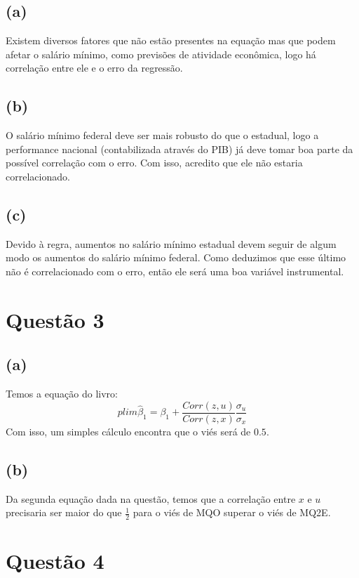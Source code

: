 \documentclass[12pt]{article}
\begin{document}
\subsection*{(a)}
Existem diversos fatores que não estão presentes na equação mas que podem afetar o salário mínimo, como previsões de atividade econômica, logo há correlação entre ele e o erro da regressão.

\subsection*{(b)}
O salário mínimo federal deve ser mais robusto do que o estadual, logo a performance nacional (contabilizada através do PIB) já deve tomar boa parte da possível correlação com o erro. Com isso, acredito que ele não estaria correlacionado.

\subsection*{(c)}
Devido à regra, aumentos no salário mínimo estadual devem seguir de algum modo os aumentos do salário mínimo federal. Como deduzimos que esse último não é correlacionado com o erro, então ele será uma boa variável instrumental.

\section*{Questão 3}

\subsection*{(a)}
Temos a equação do livro:
\begin{equation*}
plim \hat{\beta}_{1}=\beta_{1} + \frac{Corr(z,u)}{Corr(z,x)}\frac{\sigma_{u}}{\sigma_{x}}
\end{equation*}
Com isso, um simples cálculo encontra que o viés será de $0.5$.

\subsection*{(b)}
Da segunda equação dada na questão, temos que a correlação entre $x$ e $u$ precisaria ser maior do que $\frac{1}{2}$ para o viés de MQO superar o viés de MQ2E.

\section*{Questão 4}
\end{document}
